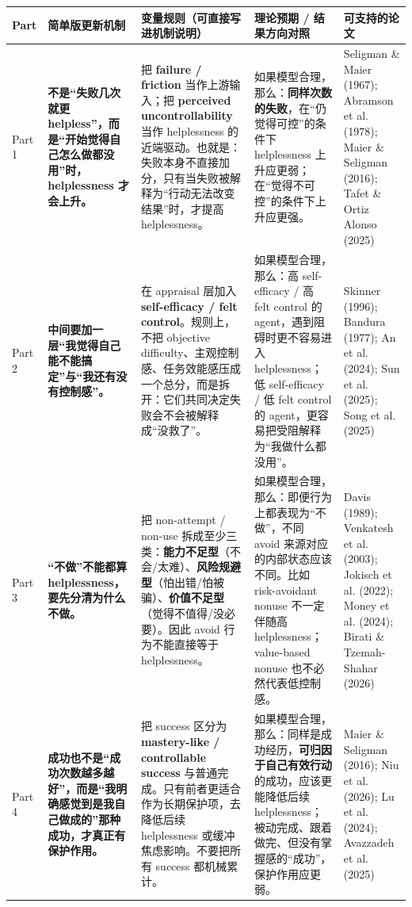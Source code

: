 \documentclass[11pt]{article}
\begin{document}
\begin{table}[htbp]
\centering
\footnotesize
\setlength{\tabcolsep}{4pt}
\renewcommand{\arraystretch}{1.25}
\begin{tabularx}{\textwidth}{P{1.15cm} Y Y Y Y}
\toprule
\textbf{Part} & \textbf{简单版更新机制} & \textbf{变量规则（可直接写进机制说明）} & \textbf{理论预期 / 结果方向对照} & \textbf{可支持的论文} \\
\midrule

Part 1 &
\textbf{不是“失败几次就更 helpless”，而是“开始觉得自己怎么做都没用”时，helplessness 才会上升。} &
把 \textbf{failure / friction} 当作上游输入；把 \textbf{perceived uncontrollability} 当作 helplessness 的近端驱动。也就是：失败本身不直接加分，只有当失败被解释为“行动无法改变结果”时，才提高 helplessness。 &
如果模型合理，那么：\textbf{同样次数的失败}，在“仍觉得可控”的条件下 helplessness 上升应更弱；在“觉得不可控”的条件下上升应更强。 &
Seligman \& Maier (1967); Abramson et al. (1978); Maier \& Seligman (2016); Tafet \& Ortiz Alonso (2025) \\

Part 2 &
\textbf{中间要加一层“我觉得自己能不能搞定”与“我还有没有控制感”。} &
在 appraisal 层加入 \textbf{self-efficacy / felt control}。规则上，不把 objective difficulty、主观控制感、任务效能感压成一个总分，而是拆开：它们共同决定失败会不会被解释成“没救了”。 &
如果模型合理，那么：高 self-efficacy / 高 felt control 的 agent，遇到阻碍时更不容易进入 helplessness；低 self-efficacy / 低 felt control 的 agent，更容易把受阻解释为“我做什么都没用”。 &
Skinner (1996); Bandura (1977); An et al. (2024); Sun et al. (2025); Song et al. (2025) \\

Part 3 &
\textbf{“不做”不能都算 helplessness，要先分清为什么不做。} &
把 non-attempt / non-use 拆成至少三类：\textbf{能力不足型}（不会/太难）、\textbf{风险规避型}（怕出错/怕被骗）、\textbf{价值不足型}（觉得不值得/没必要）。因此 avoid 行为不能直接等于 helplessness。 &
如果模型合理，那么：即便行为上都表现为“不做”，不同 avoid 来源对应的内部状态应该不同。比如 risk-avoidant nonuse 不一定伴随高 helplessness；value-based nonuse 也不必然代表低控制感。 &
Davis (1989); Venkatesh et al. (2003); Jokisch et al. (2022); Money et al. (2024); Birati \& Tzemah-Shahar (2026) \\

Part 4 &
\textbf{成功也不是“成功次数越多越好”，而是“我明确感觉到是我自己做成的”那种成功，才真正有保护作用。} &
把 success 区分为 \textbf{mastery-like / controllable success} 与普通完成。只有前者更适合作为长期保护项，去降低后续 helplessness 或缓冲焦虑影响。不要把所有 success 都机械累计。 &
如果模型合理，那么：同样是成功经历，\textbf{可归因于自己有效行动}的成功，应该更能降低后续 helplessness；被动完成、跟着做完、但没有掌握感的“成功”，保护作用应更弱。 &
Maier \& Seligman (2016); Niu et al. (2026); Lu et al. (2024); Avazzadeh et al. (2025) \\


\end{tabularx}
\end{table}
\end{document}
